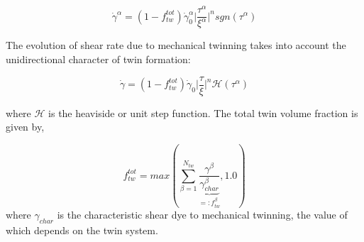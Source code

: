 \begin{equation}
\dot{\gamma}^{\alpha} = (1-f_{tw}^{tot}) \dot{\gamma}^{\alpha}_{0} \bigg| \frac{\tau^\alpha} {\xi^\alpha} \bigg|^n sgn(\tau^\alpha)
\end{equation}

The evolution of shear rate due to mechanical twinning takes into account the unidirectional character of twin formation:

\begin{equation}
\dot{\gamma} = (1-f_{tw}^{tot}) \dot{\gamma}_{0} \bigg| \frac{\tau}{\xi} \bigg|^n \mathcal{H}(\tau^\alpha)
\end{equation}

where $\mathcal{H}$ is the heaviside or unit step function. The total twin volume fraction is given by,

\begin{equation}
f_{tw}^{tot} = max \left(  \sum_{\beta=1}^{N_{tw}} \underbrace{\frac{\gamma^{\beta}}{\gamma^{\beta}_{char}}}_{=:f^{\beta}_{tw}},1.0 \right)
\end{equation}
where $\gamma_{char}$ is the characteristic shear dye to mechanical twinning, the value of which depends on the twin system.









